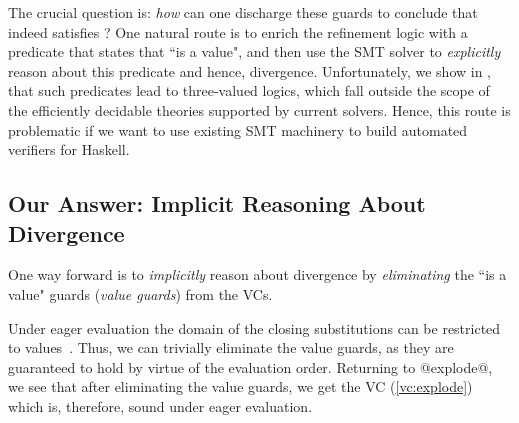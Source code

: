The crucial question is: \emph{how} can one discharge these guards
to conclude that \x indeed satisfies ?
%
One natural route is to enrich the refinement logic with 
a predicate that states that ``\x is a value", and then 
use the SMT solver to \emph{explicitly} reason about 
this predicate and hence, divergence.
%
Unfortunately, we show in , that 
such predicates lead to three-valued logics,
which fall outside the scope of the efficiently 
decidable theories supported by current solvers.
%
Hence, this route is problematic if we want to use 
existing SMT machinery to build automated verifiers 
for Haskell.

\subsection{Our Answer: Implicit Reasoning About Divergence}

One way forward is to \emph{implicitly} reason about divergence 
by \emph{eliminating} the ``\x is a value" guards (\ie \emph{value guards}) from the VCs.

Under eager evaluation the domain of the closing substitutions 
can be restricted to values~\cite{Greenberg11}.
%
Thus, we can trivially eliminate the value guards, 
as they are guaranteed to hold by virtue of the 
evaluation order.
%
Returning to @explode@, we see that after eliminating 
the value guards, we get the VC (\ref{vc:explode})
which is, therefore, sound under eager evaluation.

